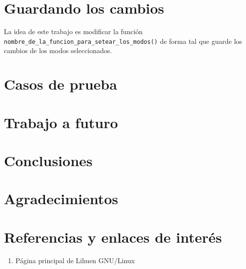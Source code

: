 \documentclass[final,narroweqnarray,inline,twoside]{ieee}
\begin{document}
\section{Guardando los cambios}
La idea de este trabajo es modificar la función \texttt{nombre\_de\_la\_funcion\_para\_setear\_los\_modos()} de forma tal
que guarde los cambios de los modos seleccionados.
\section{Casos de prueba}

\section{Trabajo a futuro}

\section{Conclusiones}

\section{Agradecimientos}

\section{Referencias y enlaces de interés}

\begin{enumerate}
\item Página principal de Lihuen GNU/Linux\\
\\[Visitado el día 9 de enero de 2009]
\end{enumerate}
\end{document}
